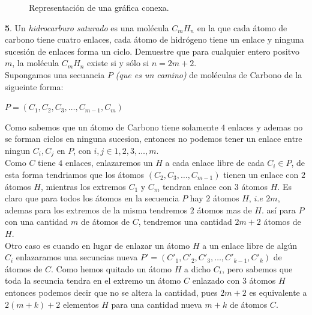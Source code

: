 \documentclass[12pt]{article}
\begin{document}
\begin{figure}[h!]
\begin{minipage}{0.2\textwidth}
        \caption{\scriptsize Representación de una gráfica conexa.}
    \end{minipage}
\end{figure}

\vspace{1cm}

%
%
\textbf{5}. Un \textit{hidrocarburo saturado} es una molécula $C_mH_n$ en la que cada átomo de carbono tiene cuatro enlaces, cada átomo de hidrógeno 
tiene un enlace y ninguna sucesión de enlaces forma un ciclo. Demuestre que para cualquier entero positvo $m$, la molécula $C_mH_n$ existe si y sólo si 
$n = 2m +2$.\\

Supongamos una secuancia $P$ \textit{(que es un camino)} de moléculas de Carbono de la sigueinte forma:

\begin{center}
    $P = (C_1, C_2, C_3, \dots,C_{m-1},C_m)$
\end{center}

Como sabemos que un átomo de Carbono tiene solamente $4$ enlaces y ademas no se forman ciclos en ninguna sucesion, entonces no podemos
tener un enlace entre ningun $C_i,C_j$ en $P$, con $i,j \in {1,2,3,\dots,m}$.\\

Como $C$ tiene $4$ enlaces, enlazaremos un $H$ a cada enlace libre de cada $C_i \in P$, de 
esta forma tendriamos que los átomos $(C_2, C_3,\dots,C_{m-1})$ tienen un enlace con $2$ átomos $H$, mientras los extremos $C_1$ y $C_m$ tendran enlace 
con $3$ átomos $H$. Es claro que para todos los átomos en la secuencia $P$ hay $2$ átomos $H$, $i.e$ $2m$, ademas para los extremos de la
misma tendremos $2$ átomos mas de $H$. así para $P$ con una cantidad $m$ de átomos de $C$, tendremos una cantidad $2m +2$ átomos de $H$.\\

Otro caso es cuando en lugar de enlazar un átomo $H$ a un enlace libre de algún $C_i$ enlazaramos una secuncias nueva $P' = (C'_1,C'_2, C'_3,\dots,C'_{k-1},C'_k)$ de átomos de $C$.
Como hemos quitado un átomo $H$ a dicho $C_i$, pero sabemos que toda la secuncia tendra en el extremo un átomo $C$ enlazado con 
$3$ átomos $H$ entonces podemos decir que no se altera la cantidad, pues $2m + 2$ es equivalente a  $2(m + k) +2$ elementos $H$ para una cantidad nueva $m + k$ de 
átomos $C$.\\
\end{document}
